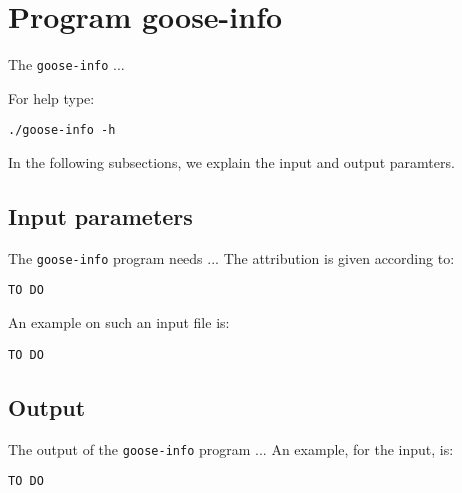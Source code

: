 \section{Program goose-info}
The \texttt{goose-info} ...

For help type:
\begin{lstlisting}
./goose-info -h
\end{lstlisting}
In the following subsections, we explain the input and output paramters.

\subsection*{Input parameters}

The \texttt{goose-info} program needs ...
The attribution is given according to:
\begin{lstlisting}
TO DO
\end{lstlisting}

An example on such an input file is:
\begin{lstlisting}
TO DO
\end{lstlisting}

\subsection*{Output}
The output of the \texttt{goose-info} program ...
An example, for the input, is:
\begin{lstlisting}
TO DO
\end{lstlisting}
